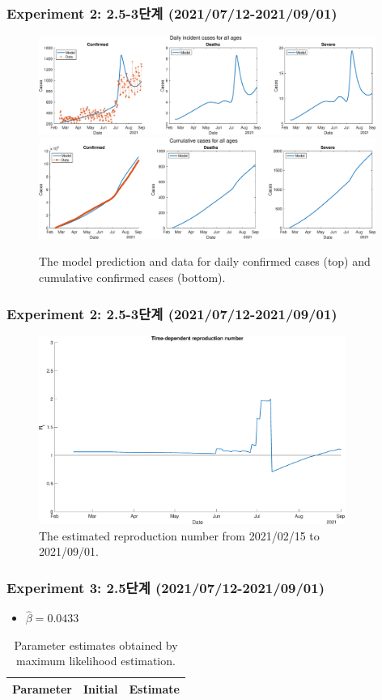 \documentclass[aspectratio=169, 9pt, xcolor=dvipsnames]{beamer}
\begin{document}
	\begin{frame}\frametitle{Experiment 2: 2.5-3단계 (2021/07/12-2021/09/01)}
	    \begin{figure}
	    	\centering
	    	\includegraphics[width=11cm]{../results/estimate_sd_2nd_2/daily_all_age.eps}
	    	\includegraphics[width=11cm]{../results/estimate_sd_2nd_2/cumul_all_age.eps}
	    	\caption{The model prediction and data for daily confirmed cases (top) and cumulative confirmed cases (bottom).}
	    \end{figure}
	\end{frame}

	\begin{frame}\frametitle{Experiment 2: 2.5-3단계 (2021/07/12-2021/09/01)}
	    \begin{figure}
	    	\centering
	    	\includegraphics[width=10cm]{../results/estimate_sd_2nd_2/rep_num.eps}
	    	\caption{The estimated reproduction number from 2021/02/15 to 2021/09/01.}
	    \end{figure}
	\end{frame}

	\begin{frame}\frametitle{Experiment 3: 2.5단계 (2021/07/12-2021/09/01)}
	    \begin{itemize}
			\item $\hat{\beta} = 0.0433$
		\end{itemize}
	    \begin{table}
	    	\begin{tabular}{crr}
	    		\toprule
	    		\textbf{Parameter} & \textbf{Initial} & \textbf{Estimate} \\
	    		\midrule
	    		
	    		\bottomrule
	    	\end{tabular}
	    	\caption{Parameter estimates obtained by maximum likelihood estimation.}
	    \end{table}
	\end{frame}
\end{document}
